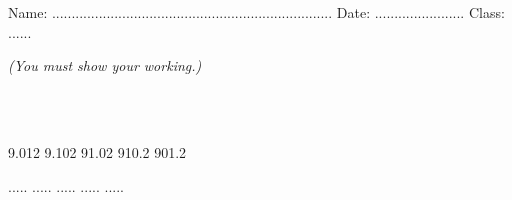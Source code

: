 \documentclass{article}
\date{}
\begin{document}
\fontsize{13}{15} \selectfont %

\begin{center}
  \qquad \\ 
\end{center} \\ 

Name: ........................................................................ \hspace{0.5cm}  Date: ....................... \hspace{0.5cm}  Class: ......

\par
\vspace*{10pt} 
\textit{(You must show your working.)  }
\vspace{10pt}

\hline
\vspace{10pt}

\par
{} \\
\vspace*{20pt}
\par

\begin{flushright}
\end{flushright}
 \vspace{10pt}

\hline
\vspace{10pt}

\par
{} \\

9.012 \hspace{3cm} 9.102 \hspace{3cm} 91.02 \hspace{3cm} 910.2 \hspace{3cm} 901.2 
\vspace{30pt}

 ..... \hspace{3cm} ..... \hspace{3cm}  ..... \hspace{3cm} ..... \hspace{3cm} .....  

\par
{} 
\vspace{10pt}
\end{document}
